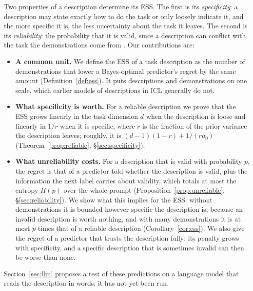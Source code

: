 \documentclass[10pt]{article}
\begin{document}
Two properties of a description determine its ESS. The first is its \emph{specificity}: a description may state exactly how to do the task or only loosely indicate it, and the more specific it is, the less uncertainty about the task it leaves. The second is its \emph{reliability}: the probability that it is valid, since a description can conflict with the task the demonstrations come from \citep{evans2006}. Our contributions are:
\begin{itemize}
    \item \textbf{A common unit.} We define the ESS of a task description as the number of demonstrations that lower a Bayes-optimal predictor's regret by the same amount (Definition~\ref{def:ess}). It puts descriptions and demonstrations on one scale, which earlier models of descriptions in ICL generally do not.
    \item \textbf{What specificity is worth.} For a reliable description we prove that the ESS grows linearly in the task dimension $d$ when the description is loose and linearly in $1/r$ when it is specific, where $r$ is the fraction of the prior variance the description leaves; roughly, it is $(d-1)(1-r) + 1/(r a_0)$ (Theorem~\ref{prop:reliable}, \S\ref{sec:specificity}).
    \item \textbf{What unreliability costs.} For a description that is valid with probability $p$, the regret is that of a predictor told whether the description is valid, plus the information the next label carries about validity, which totals at most the entropy $H(p)$ over the whole prompt (Proposition~\ref{prop:unreliable}, \S\ref{sec:reliability}). We show what this implies for the ESS: without demonstrations it is bounded however specific the description is, because an invalid description is worth nothing, and with many demonstrations it is at most $p$ times that of a reliable description (Corollary~\ref{cor:ess}). We also give the regret of a predictor that trusts the description fully: its penalty grows with specificity, and a specific description that is sometimes invalid can then be worse than none.
\end{itemize}
Section~\ref{sec:llm} proposes a test of these predictions on a language model that reads the description in words; it has not yet been run.
\end{document}
